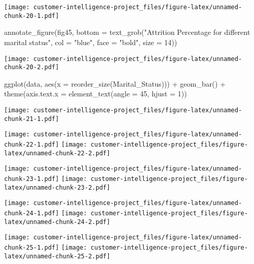 \documentclass[
]{article}
\newenvironment{Shaded}{\begin{snugshade}}{\end{snugshade}}
\newcommand{\AttributeTok}[1]{\textcolor[rgb]{0.77,0.63,0.00}{#1}}
\newcommand{\DecValTok}[1]{\textcolor[rgb]{0.00,0.00,0.81}{#1}}
\newcommand{\FunctionTok}[1]{\textcolor[rgb]{0.00,0.00,0.00}{#1}}
\newcommand{\NormalTok}[1]{#1}
\newcommand{\SpecialCharTok}[1]{\textcolor[rgb]{0.00,0.00,0.00}{#1}}
\newcommand{\StringTok}[1]{\textcolor[rgb]{0.31,0.60,0.02}{#1}}
\begin{document}
\texttt{[image: customer-intelligence-project\_files/figure-latex/unnamed-chunk-20-1.pdf]}

\begin{Shaded}
\begin{Highlighting}[]
\FunctionTok{annotate\_figure}\NormalTok{(fig45, }\AttributeTok{bottom  =} \FunctionTok{text\_grob}\NormalTok{(}\StringTok{"Attrition Percentage for different marital status"}\NormalTok{, }\AttributeTok{col =} \StringTok{"blue"}\NormalTok{, }\AttributeTok{face =} \StringTok{"bold"}\NormalTok{, }\AttributeTok{size =} \DecValTok{14}\NormalTok{))}
\end{Highlighting}
\end{Shaded}

\texttt{[image: customer-intelligence-project\_files/figure-latex/unnamed-chunk-20-2.pdf]}

\begin{Shaded}
\begin{Highlighting}[]
\FunctionTok{ggplot}\NormalTok{(data, }\FunctionTok{aes}\NormalTok{(}\AttributeTok{x =} \FunctionTok{reorder\_size}\NormalTok{(}\StringTok{\textasciigrave{}}\AttributeTok{Marital\_Status}\StringTok{\textasciigrave{}}\NormalTok{))) }\SpecialCharTok{+}
        \FunctionTok{geom\_bar}\NormalTok{() }\SpecialCharTok{+}
        \FunctionTok{theme}\NormalTok{(}\AttributeTok{axis.text.x =} \FunctionTok{element\_text}\NormalTok{(}\AttributeTok{angle =} \DecValTok{45}\NormalTok{, }\AttributeTok{hjust =} \DecValTok{1}\NormalTok{))}
\end{Highlighting}
\end{Shaded}

\texttt{[image: customer-intelligence-project\_files/figure-latex/unnamed-chunk-21-1.pdf]}

\texttt{[image: customer-intelligence-project\_files/figure-latex/unnamed-chunk-22-1.pdf]}
\texttt{[image: customer-intelligence-project\_files/figure-latex/unnamed-chunk-22-2.pdf]}

\texttt{[image: customer-intelligence-project\_files/figure-latex/unnamed-chunk-23-1.pdf]}
\texttt{[image: customer-intelligence-project\_files/figure-latex/unnamed-chunk-23-2.pdf]}

\texttt{[image: customer-intelligence-project\_files/figure-latex/unnamed-chunk-24-1.pdf]}
\texttt{[image: customer-intelligence-project\_files/figure-latex/unnamed-chunk-24-2.pdf]}

\texttt{[image: customer-intelligence-project\_files/figure-latex/unnamed-chunk-25-1.pdf]}
\texttt{[image: customer-intelligence-project\_files/figure-latex/unnamed-chunk-25-2.pdf]}
\end{document}
